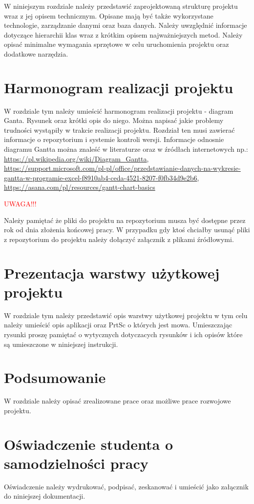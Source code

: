 W niniejszym rozdziale należy przedstawić zaprojektowaną strukturę projektu wraz z jej opisem technicznym. Opisane mają być także wykorzystane technologie, zarządzanie danymi oraz baza danych. Należy uwzględnić informacje dotyczące hierarchii klas wraz z krótkim opisem najważniejszych metod. Należy opisać minimalne wymagania sprzętowe w celu uruchomienia projektu oraz dodatkowe narzędzia. 

\section{Harmonogram realizacji projektu}

W rozdziale tym należy umieścić harmonogram realizacji projektu - diagram Ganta. Rysunek oraz krótki opis do niego. Można napisać jakie problemy trudności wystąpiły w trakcie realizacji projektu. Rozdział ten musi zawierać informacje o repozytorium i systemie kontroli wersji. Informacje odnosnie diagramu Gantta można znaleść w literaturze oraz w źródłach internetowych np.: \url{https://pl.wikipedia.org/wiki/Diagram_Gantta}, \url{https://support.microsoft.com/pl-pl/office/przedstawianie-danych-na-wykresie-gantta-w-programie-excel-f8910ab4-ceda-4521-8207-f0fb34d9e2b6}, \url{https://asana.com/pl/resources/gantt-chart-basics}


\textcolor{red}{UWAGA!!!} 

\noindent Należy pamiętać że pliki do projektu na repozytorium musza być dostępne przez rok od dnia złożenia końcowej pracy. W przypadku gdy ktoś chciałby usunąć pliki z repozytorium do projektu należy dołączyć załącznik z plikami źródłowymi. 

\section{Prezentacja warstwy użytkowej projektu}

W rozdziale tym należy przedstawić opis warstwy użytkowej projektu w tym celu należy umieścić opis aplikacji oraz PrtSc o których jest mowa. Umieszczając rysunki proszę pamiętać o wytycznych dotyczacych rysunków i ich opisów które są umieszczone w niniejszej instrukcji. 

\section{Podsumowanie}

W rozdziale należy opisać zrealizowane prace oraz możliwe prace rozwojowe projektu.


\section{Oświadczenie studenta o samodzielności pracy}

Oświadczenie należy wydrukować, podpisać, zeskanować i umieścić jako załącznik do niniejszej dokumentacji.


